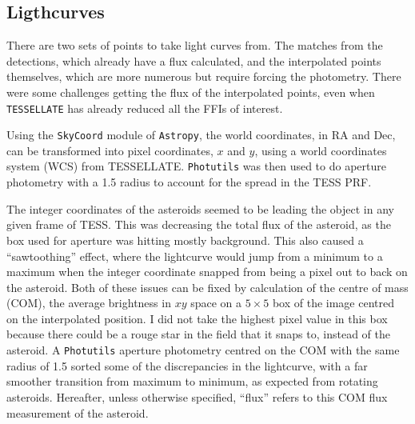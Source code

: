 \documentclass{UCreport}
\begin{document}
\subsection{Ligthcurves}\label{SubSec:Lightcurves}

There are two sets of points to take light curves from.
The matches from the detections, which already have a flux calculated, and the interpolated points themselves, which are more numerous but require forcing the photometry.
There were some challenges getting the flux of the interpolated points, even when \texttt{TESSELLATE} has already reduced all the FFIs of interest.

Using the \texttt{SkyCoord} module of \texttt{Astropy}, the world coordinates, in RA and Dec, can be transformed into pixel coordinates, $x$ and $y$, using a world coordinates system (WCS) from TESSELLATE.
\texttt{Photutils} \citep{Bradley2024} was then used to do aperture photometry with a \qty{1.5}{\px} radius to account for the spread in the TESS PRF. %

The integer coordinates of the asteroids seemed to be leading the object in any given frame of TESS. %
This was decreasing the total flux of the asteroid, as the box used for aperture  was hitting mostly background.
This also caused a ``sawtoothing'' effect, where the lightcurve would jump from a minimum to a maximum when the integer coordinate snapped from being a pixel out to back on the asteroid.
Both of these issues can be fixed by calculation of the centre of mass (COM), the average brightness in $xy$ space on a $5\times5$ \unit{\px} box of the image centred on the interpolated position.
I did not take the highest pixel value in this box because there could be a rouge star in the field that it snaps to, instead of the asteroid.
A \texttt{Photutils} aperture photometry centred on the COM with the same radius of \qty{1.5}{\px} sorted some of the discrepancies in the lightcurve, with a far smoother transition from maximum to minimum, as expected from rotating asteroids. Hereafter, unless otherwise specified, ``flux'' refers to this COM flux measurement of the asteroid.
\end{document}
